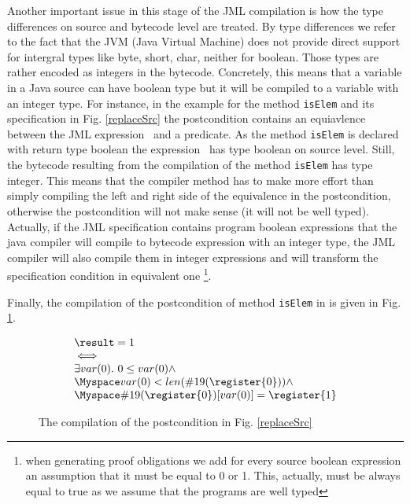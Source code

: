 \begin{enumerate}
Another important issue in this stage of the JML compilation is how the type differences on source and bytecode level are treated. 
By type differences we refer to the fact that the JVM (Java Virtual Machine) does not provide direct support for intergral types like byte, short, char, neither for boolean. Those types are rather encoded as integers in the bytecode. Concretely, this means that a variable in a Java source can have boolean type but it will be compiled to a variable with
an integer type.%
For instance, in the example for the method 
\texttt{isElem} and its specification in Fig. \ref{replaceSrc}  the postcondition contains an equiavlence between the JML expression  
\result \ and a predicate. As the method \texttt{isElem} is declared with return type boolean the expression \result \ has type boolean on source level. 
Still, the bytecode resulting from the compilation of the method  \texttt{isElem} has type integer. This means that the compiler method has to make
 more effort than simply compiling the left and right side of the equivalence in the postcondition, otherwise the postcondition will not make sense
 (it will not be well typed). Actually, 
if the JML specification contains program boolean expressions that the java compiler will compile to bytecode expression with an integer type, the JML compiler 
will also compile them in integer expressions and will transform the specification condition in equivalent one 
\footnote{when generating proof obligations we add for every source boolean expression an assumption that it must be equal to 0 or 1. This, actually, must be always
equal to true as we assume that the programs are well typed}.  

Finally, the compilation of the postcondition of method \texttt{isElem} in  is given in Fig. \ref{postCompile}.
\begin{figure}[tb]
 $$\begin{array}{l}
         \result = 1 \\
         \iff \\ 
         \exists  var(0) . \ 0 \leq var(0) \wedge \\
         \Myspace var(0) < len(\#19(\register{0})) \wedge\\
         \Myspace  \#19(\register{0})[var(0)] = \register{1}  
   \end{array}
$$
\caption{The compilation of the postcondition in Fig. \ref{replaceSrc}}
\label{postCompile}
\end{figure}


\end{enumerate}
